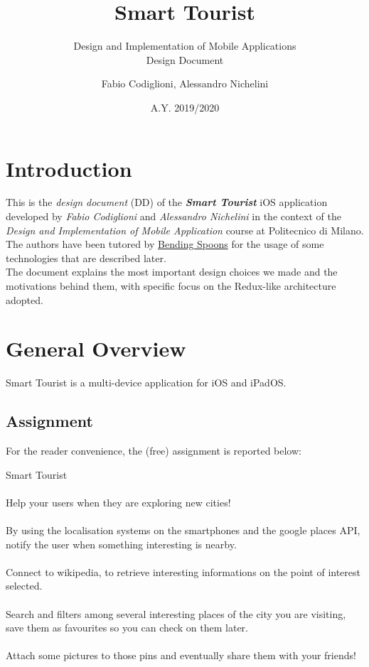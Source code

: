 \documentclass[a4paper, 11pt, parskip=half]{scrreprt}
\title{Smart Tourist}
\subtitle{Design and Implementation of Mobile Applications\\Design Document}
\date{A.Y. 2019/2020}
\author{Fabio Codiglioni, Alessandro Nichelini}
\theoremstyle{definition}
\newenvironment{warn}[1][Warning:]{ %
	\medskip
	\begin{mdframed}[style=warning]
		\noindent{\textbf{#1}}
}{
	\end{mdframed}
}
\begin{document}
\maketitle
\tableofcontents
\newpage
{}



\chapter{Introduction}
This is the \textit{design document} (DD) of the \textbf{\textit{Smart Tourist}} iOS application developed by \textit{Fabio Codiglioni} and \textit{Alessandro Nichelini} in the context of the \textit{Design and Implementation of Mobile Application} course at Politecnico di Milano. The authors have been tutored by \underline{Bending Spoons} for the usage of some technologies that are described later.\\
The document explains the most important design choices we made and the motivations behind them, with specific focus on the Redux-like architecture adopted.




\chapter{General Overview}
Smart Tourist is a multi-device application for iOS and iPadOS.

\section{Assignment}
For the reader convenience, the (free) assignment is reported below:
\begin{warn}[Assignement:]
	 Smart Tourist
	 \\\\Help your users when they are exploring new cities!
	 \\\\By using the localisation systems on the smartphones and the google places API, notify the user when something interesting is nearby.
	 \\\\Connect to wikipedia, to retrieve interesting informations on the point of interest selected.
	 \\\\Search and filters among several interesting places of the city you are visiting, save them as favourites so you can check on them later.
	 \\\\Attach some pictures to those pins and eventually share them with your friends!
\end{warn}
\end{document}
